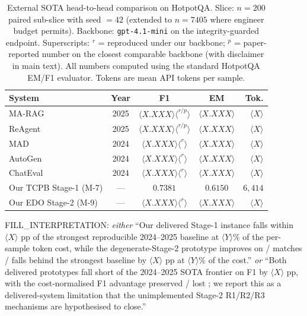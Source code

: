 \begin{table}[t]
\centering
\small
\setlength{\tabcolsep}{3pt}
\begin{tabular}{@{}lcccr@{}}
\toprule
\textbf{System} & \textbf{Year} & \textbf{F1} & \textbf{EM} & \textbf{Tok.} \\
\midrule
MA-RAG~\citep{tran2025marag}        & 2025 & $\langle X.XXX \rangle\langle^{r/p}\rangle$ & $\langle X.XXX \rangle$ & $\langle X \rangle$ \\
ReAgent~\citep{liu2025reagent}      & 2025 & $\langle X.XXX \rangle\langle^{r/p}\rangle$ & $\langle X.XXX \rangle$ & $\langle X \rangle$ \\
MAD~\citep{du2024improving}         & 2024 & $\langle X.XXX \rangle\langle^{r}\rangle$  & $\langle X.XXX \rangle$ & $\langle X \rangle$ \\
AutoGen~\citep{wu2023autogen}       & 2024 & $\langle X.XXX \rangle\langle^{r}\rangle$  & $\langle X.XXX \rangle$ & $\langle X \rangle$ \\
ChatEval~\citep{chan2024chateval}   & 2024 & $\langle X.XXX \rangle\langle^{r}\rangle$  & $\langle X.XXX \rangle$ & $\langle X \rangle$ \\
\midrule
Our TCPB Stage-1 (M-7)              & ---  & $0.7381$                                    & $0.6150$ & $6{,}414$ \\
Our EDO Stage-2 (M-9)               & ---  & $\langle X.XXX \rangle\langle^{r}\rangle$  & $\langle X.XXX \rangle$ & $\langle X \rangle$ \\
\bottomrule
\end{tabular}
\caption{External SOTA head-to-head comparison on HotpotQA. Slice: $n{=}200$ paired sub-slice with seed $=42$ (extended to $n{=}7405$ where engineer budget permits). Backbone: \texttt{gpt-4.1-mini} on the integrity-guarded endpoint. Superscripts: $^{r}$ = reproduced under our backbone; $^{p}$ = paper-reported number on the closest comparable backbone (with disclaimer in main text). All numbers computed using the standard HotpotQA EM/F1 evaluator. Tokens are mean API tokens per sample.}
\label{tab:external-sota}
\end{table}

\langle FILL\_INTERPRETATION: \emph{either} ``Our delivered Stage-1 instance falls within $\langle X \rangle$ pp of the strongest reproducible 2024--2025 baseline at $\langle Y \rangle\%$ of the per-sample token cost, while the degenerate-Stage-2 prototype \langle improves on / matches / falls behind \rangle the strongest baseline by $\langle X \rangle$ pp at $\langle Y \rangle\%$ of the cost.'' \emph{or} ``Both delivered prototypes fall short of the 2024--2025 SOTA frontier on F1 by $\langle X \rangle$ pp, with the cost-normalised F1 advantage \langle preserved / lost \rangle; we report this as a delivered-system limitation that the unimplemented Stage-2 R1/R2/R3 mechanisms are hypothesised to close.'' \rangle

